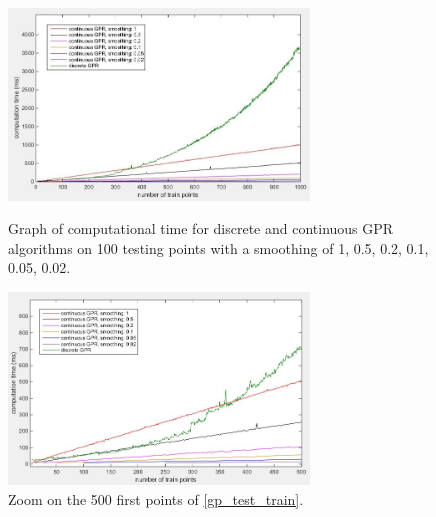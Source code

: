\begin{figure}[H]
    \begin{minipage}[b]{0.5\linewidth}
        \includegraphics[width=8cm]{img/all_curve_training_analysis.jpg}
        \caption{Graph of computational time for discrete and continuous GPR algorithms on 100 testing points with a smoothing of 1, 0.5, 0.2, 0.1, 0.05, 0.02.}
        \label{gp_test_train}
    \label{bezier_example}
    \end{minipage}
    \begin{minipage}[b]{0.5\linewidth}
        \includegraphics[width=8cm]{img/all_curve_training_analysis_500.jpg}
        \caption{Zoom on the 500 first points of \autoref{gp_test_train}.\\\hspace{0cm}\\\hspace{0cm}}
        \label{gp_test_train_500}
    \end{minipage}\hfill
\end{figure}



